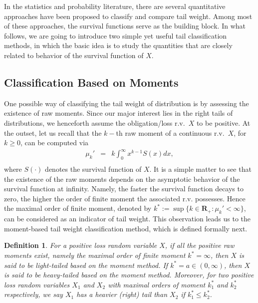 \documentclass[12pt]{article}
\newtheorem{definition}{\bf Definition}
\begin{document}
In the statistics and probability literature, there are several quantitative approaches have been proposed to classify and compare tail weight. Among most of these approaches, the survival functions serve as the building block.  In what follows, we are going to introduce two simple yet useful tail classification methods, in which the basic idea is to study the quantities that are closely related to behavior of the survival function of $X$.

\subsection{Classification Based on Moments}

One possible way of classifying the tail weight of distribution is by assessing the existence of raw moments.  Since our major interest lies in the right tails of distributions, we henceforth assume the obligation/loss r.v.\ $X$ to be positive. At the outset, let us recall that the $k-$th raw moment of a continuous r.v.\ $X$, for $k\geq 0$, can be computed via
\begin{eqnarray*}
    \mu_k' &=& k \int_0^{\infty} x^{k-1} S(x) dx, \\
    \end{eqnarray*}
where $S(\cdot)$ denotes the survival function of $X$.  It is a simple matter to see that the existence of the raw moments depends on the asymptotic behavior of the survival function at infinity.  Namely, the faster the survival function decays to zero, the higher the order of finite moment the associated r.v. possesses. Hence the maximal order of finite moment, denoted by $k^{\ast}:=\sup\{k\in \mathbf{R}_+:\mu_k'<\infty \}$, can be considered as an indicator of tail weight. This observation leads us to the moment-based tail weight classification method, which is defined formally next.

\begin{definition}
\label{def:moment-base}  For a positive loss random variable $X$, if all the positive raw moments exist, namely the maximal order of finite moment $k^{\ast}=\infty$, then $X$ is said to be light-tailed based on the moment method. If $k^{\ast}=a \in (0,\infty)$, then $X$ is said to be heavy-tailed based on the moment method. Moreover, for two positive loss random variables $X_1$ and $X_2$ with maximal orders of moment $k^{\ast}_1$ and $k^{\ast}_2$ respectively, we say $X_1$ has a heavier (right) tail than  $X_2$ if $k^{\ast}_1\leq k^{\ast}_2$.
\end{definition}
\end{document}
